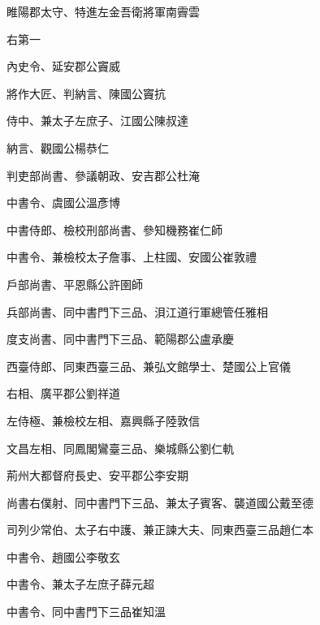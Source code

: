 \begin{pinyinscope}
 睢陽郡太守、特進左金吾衛將軍南霽雲



 右第一



 內史令、延安郡公竇威



 將作大匠、判納言、陳國公竇抗



 侍中、兼太子左庶子、江國公陳叔達



 納言、觀國公楊恭仁



 判吏部尚書、參議朝政、安吉郡公杜淹



 中書令、虞國公溫彥博



 中書侍郎、檢校刑部尚書、參知機務崔仁師



 中書令、兼檢校太子詹事、上柱國、安國公崔敦禮



 戶部尚書、平恩縣公許圉師



 兵部尚書、同中書門下三品、浿江道行軍總管任雅相



 度支尚書、同中書門下三品、範陽郡公盧承慶



 西臺侍郎、同東西臺三品、兼弘文館學士、楚國公上官儀



 右相、廣平郡公劉祥道



 左侍極、兼檢校左相、嘉興縣子陸敦信



 文昌左相、同鳳閣鸞臺三品、樂城縣公劉仁軌



 荊州大都督府長史、安平郡公李安期



 尚書右僕射、同中書門下三品、兼太子賓客、襲道國公戴至德



 司列少常伯、太子右中護、兼正諫大夫、同東西臺三品趙仁本



 中書令、趙國公李敬玄



 中書令、兼太子左庶子薛元超



 中書令、同中書門下三品崔知溫




\end{pinyinscope}
